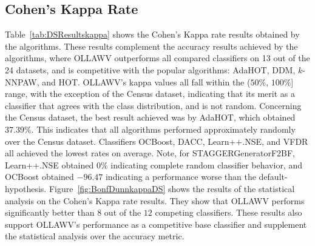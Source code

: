 \documentclass[reqno]{vcuthesis}
\numberwithin{equation}{chapter}
\begin{document}
\subsection{Cohen's Kappa Rate}
Table~\ref{tab:DSResultskappa} shows the Cohen's Kappa rate results obtained by the algorithms. These results complement the accuracy results achieved by the algorithms, where OLLAWV outperforms all compared classifiers on 13 out of the 24 datasets, and is competitive with the popular algorithms: AdaHOT, DDM, $k$-NNPAW, and HOT. OLLAWV's kappa values all fall within the ($50\%$, $100\%$] range, with the exception of the Census dataset, indicating that its merit as a classifier that agrees with the class distribution, and is not random. Concerning the Census dataset, the best result achieved was by AdaHOT, which obtained $37.39\%$. This indicates that all algorithms performed approximately randomly over the Census dataset. Classifiers OCBoost, DACC, Learn++.NSE, and VFDR all achieved the lowest rates on average. Note, for STAGGERGeneratorF2BF, Learn++.NSE obtained $0\%$ indicating complete random classifier behavior, and OCBoost obtained $-96.47$ indicating a performance worse than the default-hypothesis. Figure~\ref{fig:BonfDunnkappaDS} shows the results of the statistical analysis on the Cohen's Kappa rate results. They show that OLLAWV performs significantly better than $8$ out of the $12$ competing classifiers. These results also support OLLAWV's performance as a competitive base classifier and supplement the statistical analysis over the accuracy metric.
\end{document}
